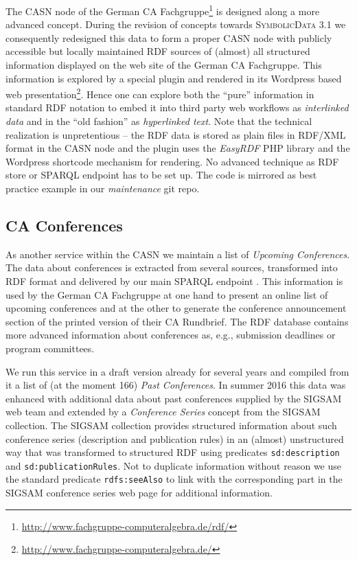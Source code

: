 \documentclass{mathincs}
\newcommand{\SD}{\textsc{Symbo\-lic\-Data}}
\begin{document}
The CASN node of the German CA Fachgruppe\footnote{
  \url{http://www.fachgruppe-computeralgebra.de/rdf/}} is designed along a
more advanced concept. During the revision of concepts towards {\SD} 3.1 we
consequently redesigned this data to form a proper CASN node with publicly
accessible but locally maintained RDF sources of (almost) all structured
information displayed on the web site of the German CA Fachgruppe.  This
information is explored by a special plugin and rendered in its Wordpress
based web presentation\footnote{
  \url{http://www.fachgruppe-computeralgebra.de/}}.  Hence one can explore
both the ``pure'' information in standard RDF notation to embed it into third
party web workflows as \emph{interlinked data} and in the ``old fashion'' as
\emph{hyperlinked text}.  Note that the technical realization is unpretentious
-- the RDF data is stored as plain files in RDF/XML format in the CASN node
and the plugin uses the \emph{EasyRDF} PHP library and the Wordpress shortcode
mechanism for rendering.  No advanced technique as RDF store or SPARQL
endpoint has to be set up.  The code is mirrored as best practice example in
our \emph{maintenance} git repo.

\subsection{CA Conferences}

As another service within the CASN we maintain a list of \emph{Upcoming
  Conferences}.  The data about conferences is extracted from several sources,
transformed into RDF format and delivered by our main SPARQL endpoint
\cite{sdsparql}.  This information is used by the German CA Fachgruppe at one
hand to present an online list of upcoming conferences and at the other to
generate the conference announcement section of the printed version of their
CA Rundbrief.  The RDF database contains more advanced information about
conferences as, e.g., submission deadlines or program committees.

We run this service in a draft version already for several years and compiled
from it a list of (at the moment 166) \emph{Past Conferences}. In summer 2016
this data was enhanced with additional data about past conferences supplied by
the SIGSAM web team and extended by a \emph{Conference Series} concept from
the SIGSAM collection.  The SIGSAM collection provides structured information
about such conference series (description and publication rules) in an
(almost) unstructured way that was transformed to structured RDF using
predicates \texttt{sd:description} and \texttt{sd:publicationRules}.  Not to
duplicate information without reason we use the standard predicate
\texttt{rdfs:seeAlso} to link with the corresponding part in the SIGSAM
conference series web page for additional information.
\end{document}
